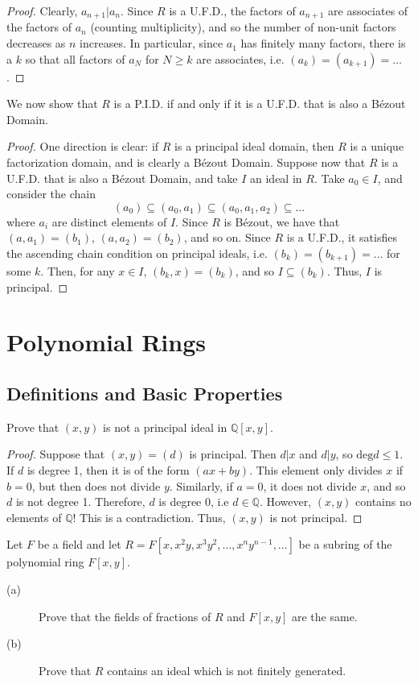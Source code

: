 \documentclass[12pt,leqno]{book}
\numberwithin{equation}{section}
\newcommand{\question}[2] {\vspace{.25in}\noindent\fbox{#1} #2 \vspace{.10in}}
\theoremstyle{definition}
\begin{document}
\begin{proof}
 Clearly, $a_{n+1}|a_n$. Since $R$ is a U.F.D., the factors of $a_{n+1}$ are associates of the factors of $a_n$ (counting multiplicity), and so the number of non-unit factors decreases as $n$ increases. In particular, since $a_1$ has finitely many factors, there is a $k$ so that all factors of $a_N$ for $N\geq k$ are associates, i.e. $(a_k)=(a_{k+1})=\hdots$. 
\end{proof}

We now show that $R$ is a P.I.D. if and only if it is a U.F.D. that is also a B\'ezout Domain.

\begin{proof}\indent
One direction is clear: if $R$ is a principal ideal domain, then $R$ is a unique factorization domain, and is clearly a B\'ezout Domain. Suppose now that $R$ is a U.F.D. that is also a B\'ezout Domain, and take $I$ an ideal in $R$.  Take $a_0\in I$, and consider the chain \[(a_0)\subseteq(a_0,a_1)\subseteq(a_0,a_1,a_2)\subseteq\hdots\] where $a_i$ are distinct elements of $I$. Since $R$ is B\'ezout, we have that $(a,a_1)=(b_1)$, $(a,a_2)=(b_2)$, and so on. Since $R$ is a U.F.D., it satisfies the ascending chain condition on principal ideals, i.e. $(b_k)=(b_{k+1})=\hdots$ for some $k$. Then, for any $x\in I$, $(b_k,x)=(b_k)$, and so $I\subseteq(b_k)$. Thus, $I$ is principal.
\end{proof}

\chapter{Polynomial Rings}
\section{Definitions and Basic Properties}
\question{6}{Prove that $(x,y)$ is not a principal ideal in $\mathbb{Q}[x,y]$.}

\begin{proof}
Suppose that $(x,y)=(d)$ is principal. Then $d|x$ and $d|y$, so $\text{deg}d\leq1$. If $d$ is degree 1, then it is of the form $(ax+by)$. This element only divides $x$ if $b=0$, but then does not divide $y$. Similarly, if $a=0$, it does not divide $x$, and so $d$ is not degree 1. Therefore, $d$ is degree 0, i.e $d\in\mathbb{Q}$. However, $(x,y)$ contains no elements of $\mathbb{Q}$! This is a contradiction. Thus, $(x,y)$ is not principal.
\end{proof}

\question{8}{Let $F$ be a field and let $R=F[x,x^2y,x^3y^2,\hdots,x^ny^{n-1},\hdots]$ be a subring of the polynomial ring $F[x,y]$.}
\begin{description}
 \item [(a)] Prove that the fields of fractions of $R$ and $F[x,y]$ are the same.
 \item [(b)] Prove that $R$ contains an ideal which is not finitely generated.
\end{description}
\end{document}
